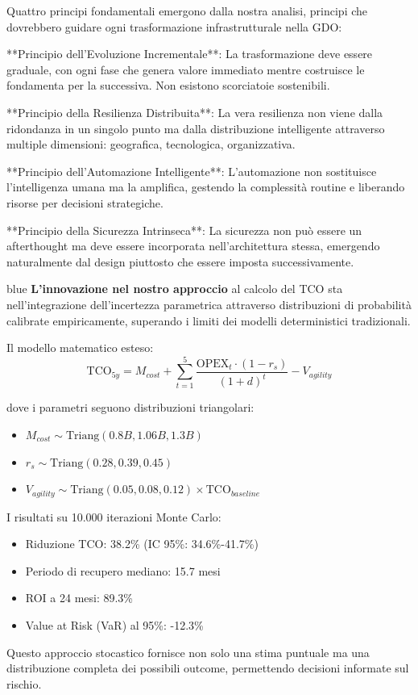 Quattro principi fondamentali emergono dalla nostra analisi, principi che dovrebbero guidare ogni trasformazione infrastrutturale nella GDO:

**Principio dell'Evoluzione Incrementale**: La trasformazione deve essere graduale, con ogni fase che genera valore immediato mentre costruisce le fondamenta per la successiva. Non esistono scorciatoie sostenibili.

**Principio della Resilienza Distribuita**: La vera resilienza non viene dalla ridondanza in un singolo punto ma dalla distribuzione intelligente attraverso multiple dimensioni: geografica, tecnologica, organizzativa.

**Principio dell'Automazione Intelligente**: L'automazione non sostituisce l'intelligenza umana ma la amplifica, gestendo la complessità routine e liberando risorse per decisioni strategiche.

**Principio della Sicurezza Intrinseca**: La sicurezza non può essere un afterthought ma deve essere incorporata nell'architettura stessa, emergendo naturalmente dal design piuttosto che essere imposta successivamente.

\begin{innovationbox}{blue}
\textbf{L'innovazione nel nostro approccio} al calcolo del TCO sta nell'integrazione dell'incertezza parametrica attraverso distribuzioni di probabilità calibrate empiricamente, superando i limiti dei modelli deterministici tradizionali.

Il modello matematico esteso:
$$\text{TCO}_{5y} = M_{cost} + \sum_{t=1}^{5} \frac{\text{OPEX}_t \cdot (1-r_s)}{(1+d)^t} - V_{agility}$$

dove i parametri seguono distribuzioni triangolari:
\begin{itemize}
\item $M_{cost} \sim \text{Triang}(0.8B, 1.06B, 1.3B)$
\item $r_s \sim \text{Triang}(0.28, 0.39, 0.45)$
\item $V_{agility} \sim \text{Triang}(0.05, 0.08, 0.12) \times \text{TCO}_{baseline}$
\end{itemize}

I risultati su 10.000 iterazioni Monte Carlo:
\begin{itemize}
\item Riduzione TCO: 38.2\% (IC 95\%: 34.6\%-41.7\%)
\item Periodo di recupero mediano: 15.7 mesi
\item ROI a 24 mesi: 89.3\%
\item Value at Risk (VaR) al 95\%: -12.3\%
\end{itemize}

Questo approccio stocastico fornisce non solo una stima puntuale ma una distribuzione completa dei possibili outcome, permettendo decisioni informate sul rischio.
\end{innovationbox}

